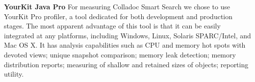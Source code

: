 \textbf{YourKit Java Pro}
For measuring Colladoc Smart Search we chose to use YourKit Pro profiler, a tool dedicated for both development and production stages. The most apparent advantage of this tool is that it can be easily integrated at any  platforms, including Windows, Linux, Solaris SPARC/Intel, and Mac OS X. It has analysis capabilities such as CPU and memory hot spots with devoted views; unique snapshot comparison; memory leak detection; memory distribution reports; measuring of shallow and retained sizes of objects; reporting utility.